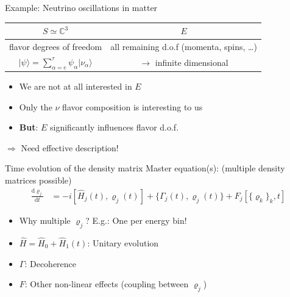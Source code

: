 \documentclass[]{beamer}
\begin{document}
\begin{frame}{Example: Neutrino oscillations in matter}
  \begin{center}
    \begin{tabular}[t]{c|c}
      \(S \simeq \mathbb{C}^3\) & \(E\) \\
      \toprule
      flavor degrees of freedom & all remaining d.o.f (momenta, spins, \ldots) \\
      \(\vert \psi \rangle = \sum_{\alpha = e}^{\tau}\psi_\alpha \vert \nu_\alpha \rangle \) & \(\rightarrow\) infinite dimensional 
    \end{tabular}
  \end{center}
  \vspace{0.5cm}
  \begin{itemize}
    \item We are not at all interested in \(E\)
    \item Only the \(\nu\) flavor composition is interesting to us 
    \item \textbf{But}: \(E\) significantly influences flavor d.o.f.
  \end{itemize}
  \(\Rightarrow\) Need effective description!
\end{frame}

\begin{frame}{Time evolution of the density matrix}
  Master equation(s): (multiple density matrices possible)
  \begin{align*}
    \frac{\mathrm{d}\varrho_j}{\mathrm{d}t} &= -i [\hat{H}_j(t), \varrho_j(t)] + \{\Gamma_j(t), \varrho_j(t)\} + F_j[\{\varrho_k\}_k, t]
  \end{align*}
  \begin{itemize}
    \item Why multiple \(\varrho_j\)? E.g.: One per energy bin!
    \item \(\hat{H} = \hat{H}_0 + \hat{H}_1(t)\): Unitary evolution
    \item \(\Gamma\): Decoherence
    \item \(F\): Other non-linear effects (coupling between \(\varrho_j\))
  \end{itemize}
\end{frame}
\end{document}
